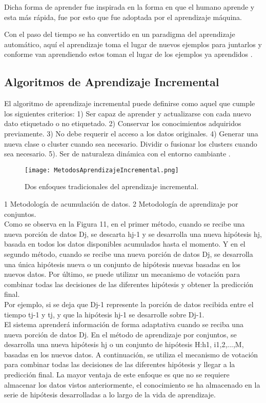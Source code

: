     Dicha forma de aprender fue inspirada en la forma en que el humano aprende y esta más rápida, fue por esto que fue adoptada por el aprendizaje m\'aquina.

    Con el paso del tiempo se ha convertido en un paradigma del aprendizaje automático, aquí el aprendizaje toma el lugar de nuevos ejemplos para juntarlos y conforme van aprendiendo estos toman el lugar de los ejemplos ya aprendidos \cite{liu2015}.

    \subsection{Algoritmos de Aprendizaje Incremental}
      El algoritmo de aprendizaje incremental puede definirse como aquel que cumple los siguientes criterios:  
      1) Ser capaz de aprender y actualizarse con cada nuevo dato etiquetado o no etiquetado. 
      2) Conservar los conocimientos adquiridos previamente.
      3) No debe requerir el acceso a los datos originales. 
      4) Generar una nueva clase o cluster cuando sea necesario. Dividir o fusionar los clusters cuando sea necesario. 
      5). Ser de naturaleza dinámica con el entorno cambiante \cite{Deshmukh2013}.

      \begin{figure}[H]
        	\centering
        	\texttt{[image: MetodosAprendizajeIncremental.png]}
            \caption{Dos enfoques tradicionales del aprendizaje incremental.}
            \label{fig:fig11}
        \end{figure} 
        1 Metodología de acumulación de datos. 2 Metodología de aprendizaje por conjuntos.\\
        
		Como se observa en la Figura 11, en el primer método, cuando se recibe una nueva porción de datos Dj, se descarta hj-1 y se desarrolla una nueva hipótesis hj, basada en todos los datos disponibles acumulados hasta el momento. 
		Y en el segundo método, cuando se recibe una nueva porción de datos Dj, se desarrolla una única hipótesis nueva o un conjunto de hipótesis nuevas basadas en los nuevos datos. 
		Por último, se puede utilizar un mecanismo de votación para combinar todas las decisiones de las diferentes hipótesis y obtener la predicción final.\\
		
		Por ejemplo, si se deja que Dj-1 represente la porción de datos recibida entre el tiempo tj-1 y tj, y que la hipótesis hj-1 se desarrolle sobre Dj-1.\\
		El sistema aprenderá información de forma adaptativa cuando se reciba una nueva porción de datos Dj.	
		En el método de aprendizaje por conjuntos, se desarrolla una nueva hipótesis hj o un conjunto de hipótesis H:h1, i1,2,...,M, basadas en los nuevos datos.  
		A continuación, se utiliza el mecanismo de votación para combinar todas las decisiones de las diferentes hipótesis y llegar a la predicción final.
		La mayor ventaja de este enfoque es que no se requiere almacenar los datos vistos anteriormente, el conocimiento se ha almacenado en la serie de hipótesis desarrolladas a lo largo de la vida de aprendizaje.\\
		
